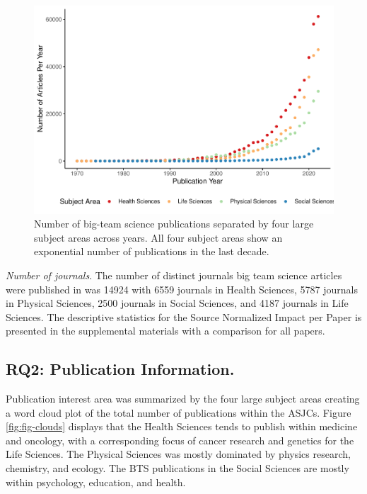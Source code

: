 \documentclass[
  man,floatsintext]{apa6}
\begin{document}
\begin{figure}
\centering
\includegraphics{manuscript_scopus_files/figure-latex/fig-pub-time-1.pdf}
\caption{\label{fig:fig-pub-time}Number of big-team science publications separated by four large subject areas across years. All four subject areas show an exponential number of publications in the last decade.}
\end{figure}

\emph{Number of journals}. The number of distinct journals big team science
articles were published in was 14924 with 6559
journals in Health Sciences, 5787 journals in Physical
Sciences, 2500 journals in Social Sciences, and
4187 journals in Life Sciences. The descriptive statistics
for the Source Normalized Impact per Paper is presented in the
supplemental materials with a comparison for all papers.

\hypertarget{rq2-publication-information.}{%
\subsection{RQ2: Publication Information.}\label{rq2-publication-information.}}

Publication interest area was summarized by the four large subject areas
creating a word cloud plot of the total number of publications within
the ASJCs. Figure \ref{fig:fig-clouds} displays that the Health
Sciences tends to publish within medicine and oncology, with a
corresponding focus of cancer research and genetics for the Life
Sciences. The Physical Sciences was mostly dominated by physics
research, chemistry, and ecology. The BTS publications in the Social
Sciences are mostly within psychology, education, and health.
\end{document}

